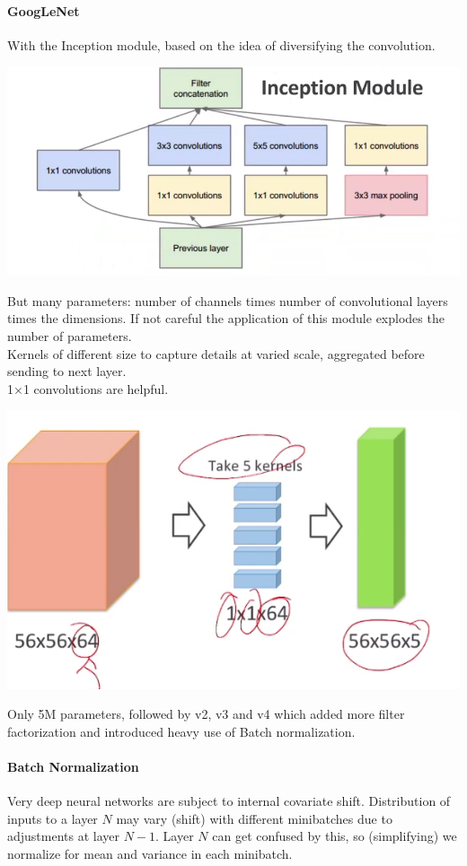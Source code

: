 \documentclass[10pt]{report}
\begin{document}
\paragraph{GoogLeNet} With the Inception module, based on the idea of diversifying the convolution.
\begin{center}
	\includegraphics[scale=0.5]{64.png}
\end{center}
But many parameters: number of channels times number of convolutional layers times the dimensions. If not careful the application of this module explodes the number of parameters.\\
Kernels of different size to capture details at varied scale, aggregated before sending to next layer.\\
1$\times$1 convolutions are helpful.\begin{center}
	\includegraphics[scale=0.5]{65.png}
\end{center}
Only 5M parameters, followed by v2, v3 and v4 which added more filter factorization and introduced heavy use of Batch normalization.
\paragraph{Batch Normalization} Very deep neural networks are subject to internal covariate shift. Distribution of inputs to a layer $N$ may vary (shift) with different minibatches due to adjustments at layer $N-1$. Layer $N$ can get confused by this, so (simplifying) we normalize for mean and variance in each minibatch.
\end{document}
